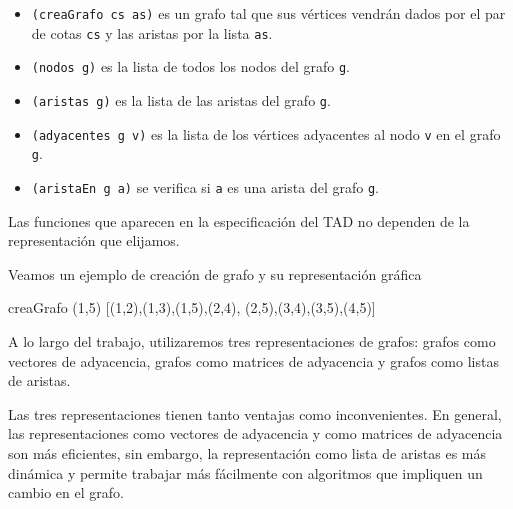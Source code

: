 \begin{itemize}
\item \texttt{(creaGrafo cs as)} es un grafo tal que sus vértices vendrán dados
              por el par de cotas \texttt{cs} y las aristas por la lista \texttt{as}.
\item \texttt{(nodos g)} es la lista de todos los nodos del grafo \texttt{g}.
\item \texttt{(aristas g)} es la lista de las aristas del grafo \texttt{g}.
\item \texttt{(adyacentes g v)} es la lista de los vértices adyacentes al nodo
             \texttt{v} en el grafo \texttt{g}.
\item \texttt{(aristaEn g a)} se verifica si \texttt{a} es una arista del grafo
             \texttt{g}.
\end{itemize}

\begin{nota}
  Las funciones que aparecen en la especificación del TAD no dependen 
  de la representación que elijamos.
\end{nota}

\begin{ejemplo}

Veamos un ejemplo de creación de grafo y su representación gráfica

\begin{code}
creaGrafo (1,5) [(1,2),(1,3),(1,5),(2,4),
                 (2,5),(3,4),(3,5),(4,5)]
\end{code}

\begin{center}
\end{center}
\end{ejemplo}

A lo largo del trabajo, utilizaremos tres representaciones de grafos: grafos
como vectores de adyacencia, grafos como matrices de adyacencia y grafos como
listas de aristas.

Las tres representaciones tienen tanto ventajas como inconvenientes. En general,
las representaciones como vectores de adyacencia y como matrices de adyacencia
son más eficientes, sin embargo, la representación como lista de aristas es más
dinámica y permite trabajar más fácilmente con algoritmos que impliquen un 
cambio en el grafo. 

